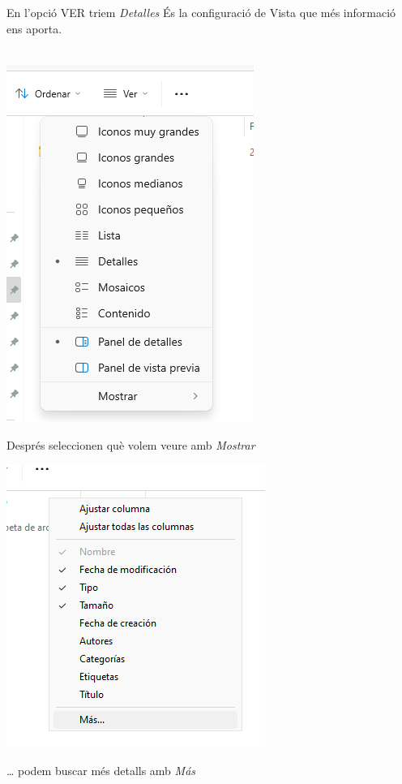 \documentclass[
  a4paper,
]{article}
\begin{document}
En l'opció VER triem \emph{Detalles} És la configuració de Vista que més
informació ens aporta.

\includegraphics{png/verVistaDetalle0.png}

Després seleccionen què volem veure amb \emph{Mostrar}

\includegraphics{png/verDetalles.png}

\ldots{} podem buscar més detalls amb \emph{Más}
\end{document}
